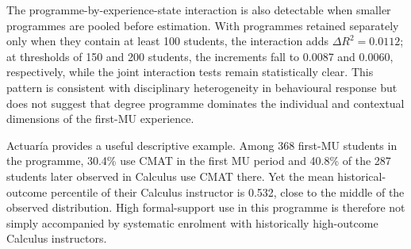 The programme-by-experience-state interaction is also detectable when smaller programmes are pooled before estimation. With programmes retained separately only when they contain at least 100 students, the interaction adds $\Delta R^2=0.0112$; at thresholds of 150 and 200 students, the increments fall to 0.0087 and 0.0060, respectively, while the joint interaction tests remain statistically clear. This pattern is consistent with disciplinary heterogeneity in behavioural response but does not suggest that degree programme dominates the individual and contextual dimensions of the first-MU experience.

Actuar\'ia provides a useful descriptive example. Among 368 first-MU students in the programme, 30.4\% use CMAT in the first MU period and 40.8\% of the 287 students later observed in Calculus use CMAT there. Yet the mean historical-outcome percentile of their Calculus instructor is 0.532, close to the middle of the observed distribution. High formal-support use in this programme is therefore not simply accompanied by systematic enrolment with historically high-outcome Calculus instructors.


